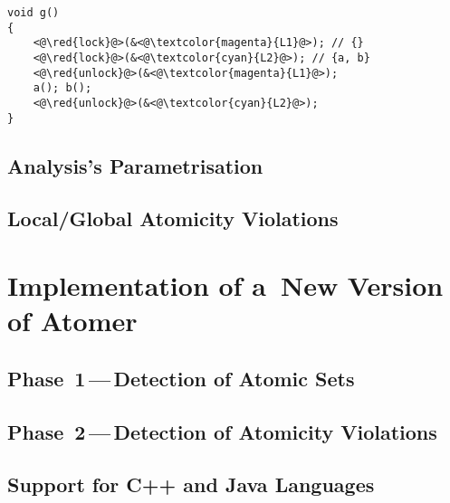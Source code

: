 \begin{lstlisting}[style=c, label={list:atomerPhase2MultiLocks}, float=hbt, caption={A~code snippet used to illustrate the \emph{advanced manipulation with locks} during the second phase of the analysis}]
void g()
{
    <@\red{lock}@>(&<@\textcolor{magenta}{L1}@>); // {}
    <@\red{lock}@>(&<@\textcolor{cyan}{L2}@>); // {a, b}
    <@\red{unlock}@>(&<@\textcolor{magenta}{L1}@>);
    a(); b();
    <@\red{unlock}@>(&<@\textcolor{cyan}{L2}@>);
}
\end{lstlisting}


\section{Analysis's Parametrisation}
\label{sec:proposalParametr}

\cite{anaconda}


\section{Local/Global Atomicity Violations}
\label{sec:proposalLocalGlobalViols}





\chapter{Implementation of a~New Version of Atomer}
\label{chap:implement}



\section{\texorpdfstring{Phase~1\,---\,Detection of Atomic Sets}{Phase~1 - Detection of Atomic Sets}}
\label{sec:implementPhase1}


\section{\texorpdfstring{Phase~2\,---\,Detection of Atomicity Violations}{Phase~2 - Detection of Atomicity Violations}}
\label{sec:implementPhase2}


\section{Support for C++ and Java Languages}
\label{sec:implementLanguages}


